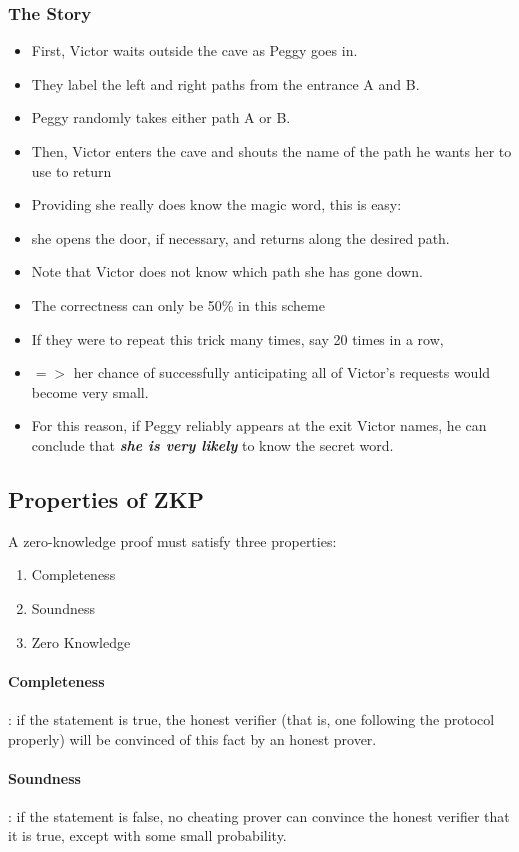 \documentclass[12pt]{article}
\begin{document}
\subsubsection{The Story}
\begin{itemize}
\item First, Victor waits outside the cave as Peggy goes in.
\item They label the left and right paths from the entrance A and B.
\item Peggy randomly takes either path A or B.
\item Then, Victor enters the cave and shouts the name of the path he wants her to use to return
\item Providing she really does know the magic word, this is easy:
\item she opens the door, if necessary, and returns along the desired path.
\item Note that Victor does not know which path she has gone down.
\item The correctness can only be 50\% in this scheme
\item If they were to repeat this trick many times, say 20 times in a row, 
\item $=>$ her chance of successfully anticipating all of Victor's requests would become very small.
\item For this reason, if Peggy reliably appears at the exit Victor names, he can conclude that \textbf{\textit{\color{blue} she is very likely}} \color{black} to know the secret word.	
\end{itemize}

\subsection{Properties of ZKP}
A zero-knowledge proof must satisfy three properties:
\begin{enumerate}
\item Completeness
\item Soundness
\item Zero Knowledge
\end{enumerate}
\paragraph{Completeness} : if the statement is true, the honest verifier (that is, one following the protocol properly) will be convinced of this fact by an honest prover.
\paragraph{Soundness} : if the statement is false, no cheating prover can convince the honest verifier that it is true, except with some small probability.
\end{document}
